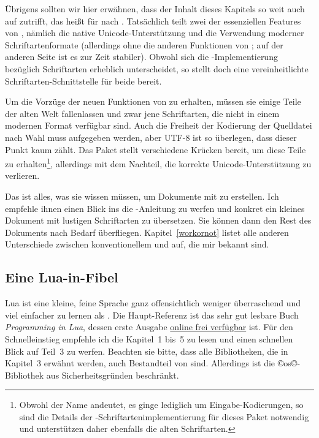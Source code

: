 \documentclass{lltxdoc}
\begin{document}
Übrigens sollten wir hier erwähnen, dass der Inhalt dieses Kapitels so weit
auch auf \xelatex zutrifft, das heißt für \latex nach \xetex. Tatsächlich 
teilt \xetex zwei der essenziellen Features von \luatex, nämlich die native
Unicode-Unterstützung und die Verwendung moderner Schriftartenformate
(allerdings ohne die anderen Funktionen von \luatex; auf der anderen Seite ist
es zur Zeit stabiler). Obwohl sich die \xelatex-Implementierung bezüglich 
Schriftarten erheblich unterscheidet, so stellt doch  eine
vereinheitlichte Schriftarten-Schnittstelle für beide bereit.

\medskip

Um die Vorzüge der neuen Funktionen von \luatex zu erhalten, müssen sie einige
Teile der alten Welt fallenlassen und zwar jene Schriftarten, die nicht in 
einem modernen Format verfügbar sind. Auch die Freiheit der Kodierung der 
Quelldatei nach Wahl muss aufgegeben werden, aber UTF-8 ist so überlegen, dass
dieser Punkt kaum zählt. Das Paket  stellt verschiedene 
Krücken bereit, um diese Teile zu erhalten\footnote{Obwohl der Name andeutet,
es ginge lediglich um Eingabe-Kodierungen, so sind die Details der 
\latex-Schriftartenimplementierung für dieses Paket notwendig und unterstützen
daher ebenfalls die alten Schriftarten.}, allerdings mit dem 
Nachteil, die korrekte Unicode-Unterstützung zu verlieren.

Das ist alles, was sie wissen müssen, um Dokumente mit \lualatex zu erstellen.
Ich empfehle ihnen einen Blick ins die -Anleitung zu werfen und
konkret ein kleines Dokument mit lustigen Schriftarten zu übersetzen. Sie 
können dann den Rest des Dokuments nach Bedarf überfliegen.
Kapitel~\ref{workornot} listet alle anderen Unterschiede zwischen konventionellem
\latex und \lualatex auf, die mir bekannt sind.


\subsection{Eine Lua-in-\tex Fibel}\label{luaintex}

Lua ist eine kleine, feine Sprache ganz offensichtlich weniger überraschend
und viel einfacher zu lernen als \tex. Die Haupt-Referenz ist das sehr gut
lesbare Buch \emph{Programming in Lua}, dessen erste Ausgabe 
\href{http://www.lua.org/pil/} {online frei verfügbar} ist. Für den 
Schnelleinstieg empfehle ich die Kapitel~1 bis~5 zu lesen und einen schnellen
Blick auf Teil~3 zu werfen. Beachten sie bitte, dass alle Bibliotheken, die in
Kapitel~3 erwähnt werden, auch Bestandteil von \luatex sind. Allerdings ist
die ©os©-Bibliothek aus Sicherheitsgründen beschränkt.
\end{document}
